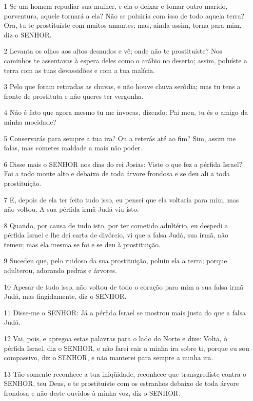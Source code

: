 \par 1 Se um homem repudiar sua mulher, e ela o deixar e tomar outro marido, porventura, aquele tornará a ela? Não se poluiria com isso de todo aquela terra? Ora, tu te prostituíste com muitos amantes; mas, ainda assim, torna para mim, diz o SENHOR.
\par 2 Levanta os olhos aos altos desnudos e vê; onde não te prostituíste? Nos caminhos te assentavas à espera deles como o arábio no deserto; assim, poluíste a terra com as tuas devassidões e com a tua malícia.
\par 3 Pelo que foram retiradas as chuvas, e não houve chuva serôdia; mas tu tens a fronte de prostituta e não queres ter vergonha.
\par 4 Não é fato que agora mesmo tu me invocas, dizendo: Pai meu, tu és o amigo da minha mocidade?
\par 5 Conservarás para sempre a tua ira? Ou a reterás até ao fim? Sim, assim me falas, mas cometes maldade a mais não poder.
\par 6 Disse mais o SENHOR nos dias do rei Josias: Viste o que fez a pérfida Israel? Foi a todo monte alto e debaixo de toda árvore frondosa e se deu ali a toda prostituição.
\par 7 E, depois de ela ter feito tudo isso, eu pensei que ela voltaria para mim, mas não voltou. A sua pérfida irmã Judá viu isto.
\par 8 Quando, por causa de tudo isto, por ter cometido adultério, eu despedi a pérfida Israel e lhe dei carta de divórcio, vi que a falsa Judá, sua irmã, não temeu; mas ela mesma se foi e se deu à prostituição.
\par 9 Sucedeu que, pelo ruidoso da sua prostituição, poluiu ela a terra; porque adulterou, adorando pedras e árvores.
\par 10 Apesar de tudo isso, não voltou de todo o coração para mim a sua falsa irmã Judá, mas fingidamente, diz o SENHOR.
\par 11 Disse-me o SENHOR: Já a pérfida Israel se mostrou mais justa do que a falsa Judá.
\par 12 Vai, pois, e apregoa estas palavras para o lado do Norte e dize: Volta, ó pérfida Israel, diz o SENHOR, e não farei cair a minha ira sobre ti, porque eu sou compassivo, diz o SENHOR, e não manterei para sempre a minha ira.
\par 13 Tão-somente reconhece a tua iniqüidade, reconhece que transgrediste contra o SENHOR, teu Deus, e te prostituíste com os estranhos debaixo de toda árvore frondosa e não deste ouvidos à minha voz, diz o SENHOR.
